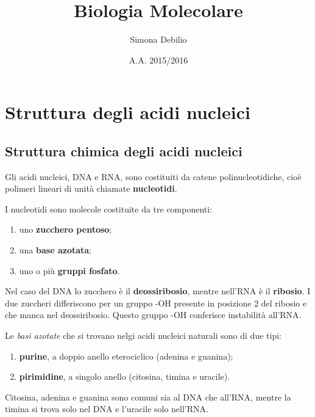 \documentclass[11pt]{book}
\title{\textbf{Biologia Molecolare}}
\author{Simona Debilio}
\date{A.A. 2015/2016}
\date{}
\begin{document}
\maketitle

\tableofcontents


\chapter{Struttura degli acidi
nucleici}\label{struttura-degli-acidi-nucleici}

\section{Struttura chimica degli acidi
nucleici}\label{struttura-chimica-degli-acidi-nucleici}

Gli acidi nucleici, DNA e RNA, sono costituiti da catene
polinucleotidiche, cioè polimeri lineari di unità chiamate
\textbf{nucleotidi}.

I nucleotidi sono molecole costituite da tre componenti:

\begin{enumerate}
\def\labelenumi{\arabic{enumi}.}
\itemsep1pt\parskip0pt
\item
  uno \textbf{zucchero pentoso};
\item
  una \textbf{base azotata};
\item
  uno o più \textbf{gruppi fosfato}.
\end{enumerate}

Nel caso del DNA lo zucchero è il \textbf{deossiribosio}, mentre
nell'RNA è il \textbf{ribosio}. I due zuccheri differiscono per un
gruppo -OH presente in posizione 2 del ribosio e che manca nel
deossiribosio. Questo gruppo -OH conferisce instabilità all'RNA.

Le \emph{basi azotate} che si trovano nelgi acidi nucleici naturali sono
di due tipi:

\begin{enumerate}
\def\labelenumi{\arabic{enumi}.}
\itemsep1pt\parskip0pt
\item
  \textbf{purine}, a doppio anello eterociclico (adenina e guanina);
\item
  \textbf{pirimidine}, a singolo anello (citosina, timina e uracile).
\end{enumerate}

Citosina, adenina e guanina sono comuni sia al DNA che all'RNA, mentre
la timina si trova solo nel DNA e l'uracile solo nell'RNA.
\end{document}
